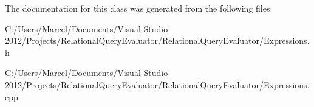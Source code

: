 The documentation for this class was generated from the following files\+:\begin{DoxyCompactItemize}
\item 
C\+:/\+Users/\+Marcel/\+Documents/\+Visual Studio 2012/\+Projects/\+Relational\+Query\+Evaluator/\+Relational\+Query\+Evaluator/Expressions.\+h\item 
C\+:/\+Users/\+Marcel/\+Documents/\+Visual Studio 2012/\+Projects/\+Relational\+Query\+Evaluator/\+Relational\+Query\+Evaluator/Expressions.\+cpp\end{DoxyCompactItemize}

